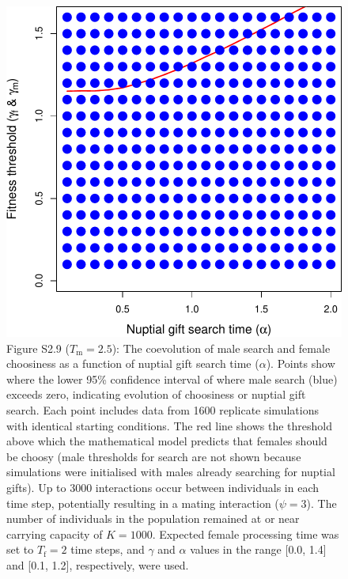 \documentclass[
]{article}
\begin{document}
\captionsetup{labelformat=default}

\clearpage

\captionsetup{labelformat=empty}

\begin{figure}
\centering
\includegraphics{ms_biorxiv_files/figure-latex/unnamed-chunk-14-1.pdf}
\caption{Figure S2.9 (\(T_{\mathrm{m}} = 2.5\)): The coevolution of male
search and female choosiness as a function of nuptial gift search time
(\(\alpha\)). Points show where the lower 95\% confidence interval of
where male search (blue) exceeds zero, indicating evolution of
choosiness or nuptial gift search. Each point includes data from 1600
replicate simulations with identical starting conditions. The red line
shows the threshold above which the mathematical model predicts that
females should be choosy (male thresholds for search are not shown
because simulations were initialised with males already searching for
nuptial gifts). Up to 3000 interactions occur between individuals in
each time step, potentially resulting in a mating interaction
(\(\psi = 3\)). The number of individuals in the population remained at
or near carrying capacity of \(K = 1000\). Expected female processing
time was set to \(T_{\mathrm{f}}=2\) time steps, and \(\gamma\) and
\(\alpha\) values in the range {[}0.0, 1.4{]} and {[}0.1, 1.2{]},
respectively, were used.}
\end{figure}
\end{document}
